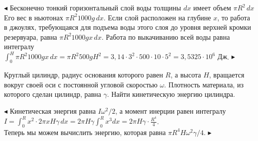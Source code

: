 \documentclass[a5paper,10pt]{article}
\begin{document}
\smallskip
\noindent $\blacktriangleleft$
Бесконечно тонкий горизонтальный слой воды толщины $dx$ имеет объем $\pi R^2\,dx$
Его вес в ньютонах $\pi R^2 1000g\,dx$. Если слой расположен на глубине $x$, то
работа в джоулях, требующаяся для подъема воды этого слоя до уровня верхней кромки
резервуара, равна $\pi R^2 1000gx\,dx$. Работа по выкачиванию всей воды равна
интегралу\\
$\displaystyle \int_0^H\pi R^2 1000gx\,dx=\pi R^2 500gH^2=
3{,}14\cdot 3^2\cdot500\cdot10\cdot5^2=
3{,}5325\cdot10^6\mbox{ Дж}$.
$\blacktriangleright$

\medskip
{} Круглый цилиндр, радиус основания которого
равен $R$, а высота $H$, вращается вокруг своей оси с постоянной
угловой скоростью $\omega$. Плотность материала, из которого
сделан цилиндр, равна $\gamma$. Найти кинетическую энергию цилиндра.

\smallskip
\noindent $\blacktriangleleft$
Кинетическая энергия равна $I\omega^2/2$, а момент инерции равен
интегралу\\
$I=\displaystyle \int_0^Rx^2\cdot2\pi xH\gamma\,dx=2\pi H\gamma\int_0^Rx^3dx=
2\pi H\gamma\cdot\frac{R^4}{4}$.\\
Теперь мы можем вычислить энергию, которая равна
$\pi R^4H\omega^2\gamma/4$. $\blacktriangleright$

\bigskip
{}
\end{document}
